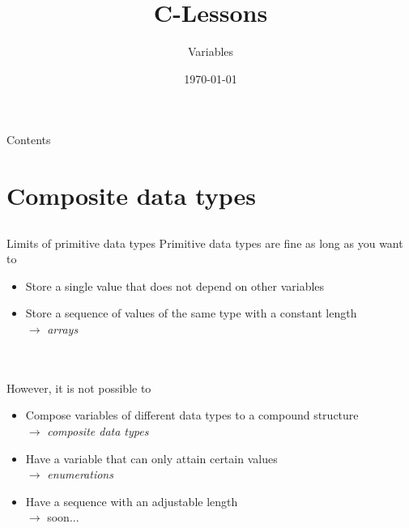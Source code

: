 


\title{C-Lessons}
\subtitle{Variables}
\date{\today}

\usetikzlibrary{tikzmark}



\maketitle

\begin{frame}{Contents}
	\tableofcontents
\end{frame}

\section{Composite data types}
\subsection{}

\begin{frame}{Limits of primitive data types}
	Primitive data types are fine as long as you want to
	\begin{itemize}
		\item Store a single value that does not depend on other variables
		\item Store a sequence of values of the same type with a constant length \\
		$\rightarrow$ \textit{arrays}
	\end{itemize} \ \\ \ \\
	However, it is not possible to
	\begin{itemize}
		\item Compose variables of different data types to a compound structure \\
		$\rightarrow$ \textit{composite data types}
		\item Have a variable that can only attain certain values \\
		$\rightarrow$ \textit{enumerations}
		\item Have a sequence with an adjustable length \\
		$\rightarrow$ soon...
	\end{itemize}
\end{frame}

